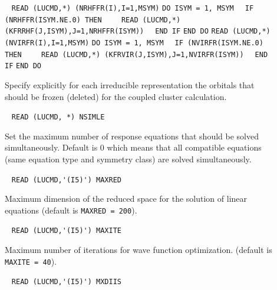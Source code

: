 \begin{description}
\item[]  \verb| |\newline
    \verb|READ (LUCMD,*) (NRHFFR(I),I=1,MSYM)|\newline
    \verb|DO ISYM = 1, MSYM|\newline
    \verb|  IF (NRHFFR(ISYM.NE.0) THEN|\newline
    \verb|    READ (LUCMD,*) (KFRRHF(J,ISYM),J=1,NRHFFR(ISYM))|\newline
    \verb|  END IF|\newline
    \verb|END DO|\newline
    \verb|READ (LUCMD,*) (NVIRFR(I),I=1,MSYM)|\newline
    \verb|DO ISYM = 1, MSYM|\newline
    \verb|  IF (NVIRFR(ISYM.NE.0) THEN|\newline
    \verb|    READ (LUCMD,*) (KFRVIR(J,ISYM),J=1,NVIRFR(ISYM))|\newline
    \verb|  END IF|\newline
    \verb|END DO|

    Specify explicitly for each irreducible representation the
    orbitals that should be frozen (deleted) for the coupled cluster
    calculation.
 
\item[] \verb| |\newline
  \verb|READ (LUCMD, *) NSIMLE|

  Set the maximum number of response equations that should be 
  solved simultaneously. Default is 0 which means that all
  compatible equations (same equation type and symmetry class) 
  are solved simultaneously.
 
\item[] \verb| |\newline 
  \verb|READ (LUCMD,'(I5)') MAXRED|

  Maximum dimension of the reduced space for the 
  solution of linear equations (default is \verb+MAXRED = 200+).
 
\item[] \verb| |\newline
  \verb|READ (LUCMD,'(I5)') MAXITE|

  Maximum number of iterations for wave function optimization.
  (default is \verb+MAXITE = 40+).
 
\item[] \verb| |\newline
  \verb|READ (LUCMD,'(I5)') MXDIIS|


\end{description}
